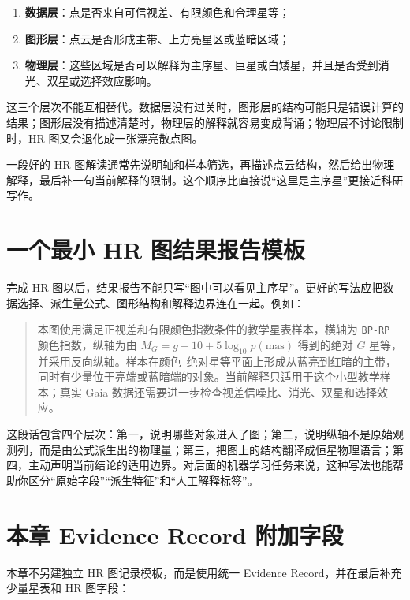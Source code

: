 \begin{enumerate}
    \item \textbf{数据层}：点是否来自可信视差、有限颜色和合理星等；
    \item \textbf{图形层}：点云是否形成主带、上方亮星区或蓝暗区域；
    \item \textbf{物理层}：这些区域是否可以解释为主序星、巨星或白矮星，并且是否受到消光、双星或选择效应影响。
\end{enumerate}

这三个层次不能互相替代。数据层没有过关时，图形层的结构可能只是错误计算的结果；图形层没有描述清楚时，物理层的解释就容易变成背诵；物理层不讨论限制时，HR 图又会退化成一张漂亮散点图。

\begin{protip}
一段好的 HR 图解读通常先说明轴和样本筛选，再描述点云结构，然后给出物理解释，最后补一句当前解释的限制。这个顺序比直接说“这里是主序星”更接近科研写作。
\end{protip}

\section{一个最小 HR 图结果报告模板}

完成 HR 图以后，结果报告不能只写“图中可以看见主序星”。更好的写法应把数据选择、派生量公式、图形结构和解释边界连在一起。例如：

\begin{quote}
本图使用满足正视差和有限颜色指数条件的教学星表样本，横轴为 \texttt{BP-RP} 颜色指数，纵轴为由 \(M_G = g-10+5\log_{10}p(\mathrm{mas})\) 得到的绝对 \(G\) 星等，并采用反向纵轴。样本在颜色--绝对星等平面上形成从蓝亮到红暗的主带，同时有少量位于亮端或蓝暗端的对象。当前解释只适用于这个小型教学样本；真实 Gaia 数据还需要进一步检查视差信噪比、消光、双星和选择效应。
\end{quote}

这段话包含四个层次：第一，说明哪些对象进入了图；第二，说明纵轴不是原始观测列，而是由公式派生出的物理量；第三，把图上的结构翻译成恒星物理语言；第四，主动声明当前结论的适用边界。对后面的机器学习任务来说，这种写法也能帮助你区分“原始字段”“派生特征”和“人工解释标签”。

\section{本章 Evidence Record 附加字段}

本章不另建独立 HR 图记录模板，而是使用统一 Evidence Record，并在最后补充少量星表和 HR 图字段：

